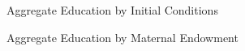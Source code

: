 \begin{frame}\begin{figure}\caption{Aggregate Education by Initial Conditions}\vspace{0.3cm}
\end{figure}\end{frame}
\begin{frame}\begin{figure}\caption{Aggregate Education by Maternal Endowment}\vspace{0.3cm}
\end{figure}\end{frame}

